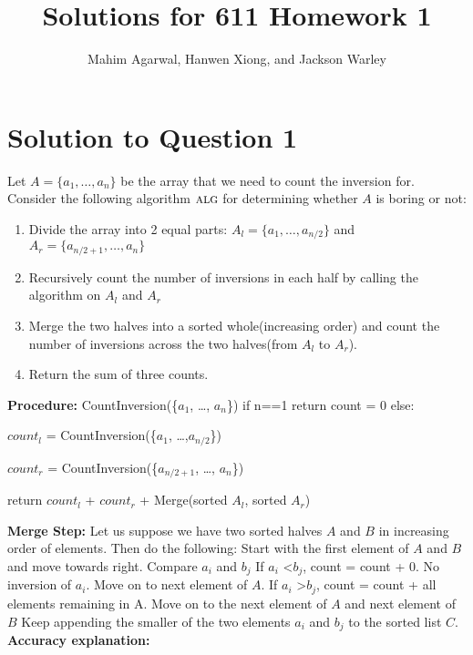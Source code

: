 \documentclass[11pt]{article}
\title{Solutions for 611 Homework 1}
\author{Mahim Agarwal, Hanwen Xiong, and Jackson Warley}
\newcommand{\alg}{\textsc{alg}}
\begin{document}
\maketitle

\section{Solution to Question 1}
Let $A = \{a_1, \dots, a_n\}$ be the array that we need to count the inversion for.
Consider the following algorithm $\alg$ for determining whether $A$ is boring or not:
\begin{enumerate}
  \item Divide the array into 2 equal parts: $A_l = \{a_1, \dots, a_{n/2}\}$ and $A_r = \{a_{n/2+1}, \dots, a_n\}$
  \item Recursively count the number of inversions in each half by calling the algorithm on $A_l$ and $A_r$
  \item Merge the two halves into a sorted whole(increasing order) and count the number of inversions across
the two halves(from $A_l$ to $A_r$).
\item Return the sum of three counts. \newline
 \end{enumerate}
{\bf Procedure:}\newline
CountInversion(\{$a_1$, \dots, $a_n$\}) \newline
if n==1 return count = 0 \newline
\newline
else:

 $count_l$ = CountInversion(\{$a_1$, \dots,$a_{n/2}$\})

 $count_r$ = CountInversion(\{$a_{n/2+1}$, \dots, $a_n$\})

return  $count_l$ + $count_r$ + Merge(sorted $A_l$, sorted $A_r$)

{\bf Merge Step:} \newline
Let us suppose we have two sorted halves $A$ and $B$ in increasing order of elements. Then do the following: \newline
Start with the first element of $A$ and $B$ and move towards right. \newline
Compare $a_i$ and $b_j$ \newline
If $a_i$ \textless  $b_j$, count = count + 0. No inversion of $a_i$. Move on to next element of $A$. \newline
If $a_i$ \textgreater $b_j$, count = count + all elements remaining in A. Move on to the next element of $A$ and next  element of $B$ \newline
Keep appending the smaller of the two elements $a_i$ and $b_j$ to the sorted list $C$. \newline
{\bf Accuracy explanation:}\newline
\end{document}
